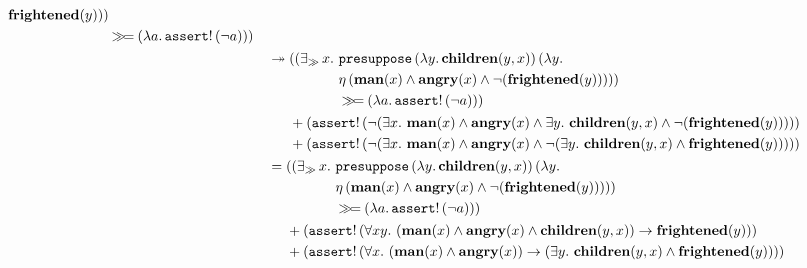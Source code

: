 \begin{align*}
\begin{aligned}[t]
\begin{aligned}[t]
{                  \textbf{frightened}(y)))} \\
           &\mathbin{\gg\!=} (\lambda a.\, \mathtt{assert}!\,(\lnot a)))
         \end{aligned}
    \end{aligned} \\
  &\twoheadrightarrow \begin{aligned}[t]
     &((\mathop{\exists_\gg} x.\ \begin{aligned}[t]
         &\mathtt{presuppose}\,(\lambda y.\, \textbf{children}(y, x))\,(\lambda y.\,  \\
         &\eta\,(\textbf{man}(x) \land \textbf{angry}(x) \land \lnot (\textbf{frightened}(y))))) \\
         &\mathbin{\gg\!=} (\lambda a.\, \mathtt{assert}!\,(\lnot a))) \\
       \end{aligned} \\
     &+ (\mathtt{assert}!\,(\lnot (\exists x.\ \textbf{man}(x) \land \textbf{angry}(x) \land
                   \exists y.\ \textbf{children}(y, x) \land
                   \lnot (\textbf{frightened}(y))))) \\
     &+ (\mathtt{assert}!\,(\lnot (\exists x.\ \textbf{man}(x) \land \textbf{angry}(x) \land
                   \lnot (\exists y.\ \textbf{children}(y, x) \land
                   \textbf{frightened}(y))))) \\
   \end{aligned} \\
  &= \begin{aligned}[t]
     &((\mathop{\exists_\gg} x.\ \begin{aligned}[t]
         &\mathtt{presuppose}\,(\lambda y.\, \textbf{children}(y, x))\,(\lambda y.\,  \\
         &\eta\,(\textbf{man}(x) \land \textbf{angry}(x) \land \lnot (\textbf{frightened}(y))))) \\
         &\mathbin{\gg\!=} (\lambda a.\, \mathtt{assert}!\,(\lnot a))) \\
       \end{aligned} \\
     &+ (\mathtt{assert}!\,(\forall x y.\ (\textbf{man}(x) \land \textbf{angry}(x) \land
                          \textbf{children}(y, x)) \to \textbf{frightened}(y))) \\
     &+ (\mathtt{assert}!\,(\forall x.\ (\textbf{man}(x) \land \textbf{angry}(x)) \to (\exists y.\ \textbf{children}(y, x) \land \textbf{frightened}(y))))
   \end{aligned}
\end{align*}

